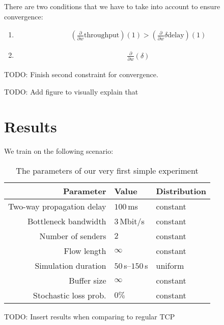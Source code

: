 \documentclass[sigconf]{acmart}
\newcommand\note[2]{{\color{#1}#2}}
\newcommand\todo[1]{{\note{red}{TODO: #1}}}
\begin{document}
There are two conditions that we have to take into account to ensure convergence:
\begin{enumerate}
\item \begin{align*}
\left(\frac{\partial}{\partial w}\text{throughput}\right)\left(1\right) > \left(\frac{\partial}{\partial w}\delta\text{delay}\right)\left(1\right)
\end{align*}
\item \begin{align*}
\frac{\partial}{\partial w}\left(\delta\right)
\end{align*}
\end{enumerate}

\todo{Finish second constraint for convergence.}

\todo{Add figure to visually explain that}
 
\section{Results}

We train on the following scenario:
 
\begin{table}[h]
\centering
\begin{tabular}{rll}
\toprule
Parameter & Value & Distribution \\
\midrule
Two-way propagation delay & $100\,$ms & constant \\
Bottleneck bandwidth & $3\,$Mbit/s & constant \\
Number of senders & $2$ & constant \\
Flow length & $\infty$ & constant \\
Simulation duration & $50\,$s--$150\,$s & uniform \\
Buffer size & $\infty$ & constant \\
Stochastic loss prob. & $0\%$ & constant \\
\bottomrule
\end{tabular}
\caption{The parameters of our very first simple experiment}
\label{tab:smallexperiment}
\end{table}

\todo{Insert results when comparing to regular TCP}
 


\end{document}
